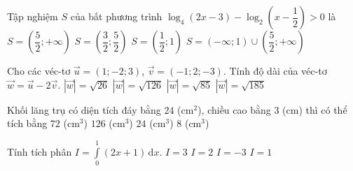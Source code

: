 \begin{ex}%
	Tập nghiệm $S$ của bất phương trình $\log_4(2x-3)-\log_2\left(x-\dfrac{1}{2}\right)>0$ là
	\choice
	{\True $S=\left(\dfrac{5}{2};+\infty \right)$}
	{$S=\left(\dfrac{3}{2};\dfrac{5}{2}\right)$}
	{$S=\left(\dfrac{1}{2};1\right)$}
	{$S=\left(-\infty ;1\right)\cup \left(\dfrac{5}{2};+\infty \right)$}
\end{ex}
\begin{ex}%
	Cho các véc-tơ $\overrightarrow{u}=\left(1;-2;3\right)$, $\overrightarrow{v}=\left(-1;2;-3\right)$. Tính độ dài của véc-tơ $\overrightarrow{w}=\overrightarrow{u}-2\overrightarrow{v}$.
	\choice
	{$\left| \overrightarrow{w}\right|=\sqrt{26}$}
	{\True $\left| \overrightarrow{w}\right|=\sqrt{126}$}
	{$\left| \overrightarrow{w}\right|=\sqrt{85}$}
	{$\left| \overrightarrow{w}\right|=\sqrt{185}$}
\end{ex}
\begin{ex}%
	Khối lăng trụ có diện tích đáy bằng $24$ (cm$^2$), chiều cao bằng $3$ (cm) thì có thể tích bằng
	\choice
	{\True $72$ (cm$^3$)}
	{$126$ (cm$^3$)}
	{$24$ (cm$^3$)}
	{$8$ (cm$^3$)}
\end{ex}
\begin{ex}%
	Tính tích phân $I=\displaystyle\int\limits_0^1{(2x+1)\mathrm{\,d}x}$.
	\choice
	{$I=3$}
	{\True $I=2$}
	{$I=-3$}
	{$I=1$}
\end{ex}
